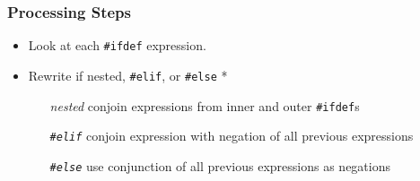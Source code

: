 \documentclass{beamer}
\newcommand\code[1]{\texttt{#1}}
\newcommand\ifdeff[1]{\code{\##1}\xspace}
\newcommand\ifdef[0]{{\upshape\ifdeff{ifdef}}\xspace}
\newcommand\ifdefs[0]{\ifdef{}s\xspace}
\begin{document}
\begin{frame}
\frametitle{Processing Steps}


\begin{itemize}

\item Look at each \ifdef expression.
\item Rewrite if nested, \ifdeff{elif}, or \ifdeff{else}  \textcolor{colorPassauAlert}{*}
	\begin{itemize}
	\item[\itshape nested] conjoin expressions from inner and outer \ifdefs
	\item[\itshape \ifdeff{elif}] conjoin expression with negation of all previous expressions
	\item[\itshape \ifdeff{else}] use conjunction of all previous expressions as negations
	\end{itemize}

\end{itemize}

\end{frame}
\end{document}
